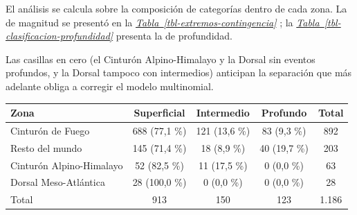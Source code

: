 \documentclass[
  spanish,
  letterpaper,
  DIV=11,
  numbers=noendperiod]{scrartcl}
\newcommand{\asesoriaStyledRef}[1]{%
  {\hypersetup{linkcolor=asesoriaLinkColor,urlcolor=asesoriaLinkColor,citecolor=asesoriaLinkColor}\textcolor{asesoriaLinkColor}{\emph{#1}}}%
}
\newcommand{\asesoriaTableLink}[1]{\hyperref[#1]{Tabla~\ref*{#1}}}
\newcommand{\asesoriaTableRef}[1]{\asesoriaStyledRef{\asesoriaTableLink{#1}}}
\begin{document}
\noindent
\begin{minipage}[t]{0.38\textwidth}
\vspace{0pt}
El análisis se calcula sobre la composición de categorías dentro de cada zona. La de magnitud se presentó en la \asesoriaTableRef{tbl-extremos-contingencia}; la \asesoriaTableRef{tbl-clasificacion-profundidad} presenta la de profundidad.

Las casillas en cero (el Cinturón Alpino-Himalayo y la Dorsal sin eventos profundos, y la Dorsal tampoco con intermedios) anticipan la separación que más adelante obliga a corregir el modelo multinomial.
\end{minipage}\hfill
\begin{minipage}[t]{0.58\textwidth}
\vspace{0pt}
\begingroup
\scriptsize
\centering
\setlength{\tabcolsep}{0.8pt}
\renewcommand{\arraystretch}{0.90}
{}
\label{tbl-clasificacion-profundidad}
\hypertarget{dest-tbl-clasificacion-profundidad}{}
\begin{tabular*}{\linewidth}{@{\extracolsep{\fill}}lcccc@{}}
\toprule
Zona & Superficial & Intermedio & Profundo & Total \\
\midrule
Cinturón de Fuego        & 688 (77,1 \%) & 121 (13,6 \%) & 83 (9,3 \%)  & 892 \\
Resto del mundo          & 145 (71,4 \%) & 18 (8,9 \%)   & 40 (19,7 \%) & 203 \\
Cinturón Alpino-Himalayo & 52 (82,5 \%)  & 11 (17,5 \%)  & 0 (0,0 \%)   & 63 \\
Dorsal Meso-Atlántica    & 28 (100,0 \%) & 0 (0,0 \%)    & 0 (0,0 \%)   & 28 \\
\midrule
Total                    & 913 & 150 & 123 & 1.186 \\
\bottomrule
\end{tabular*}
\par\vspace{0.10em}
\endgroup
\end{minipage}
\par\vspace{-0.25em}
\end{document}
